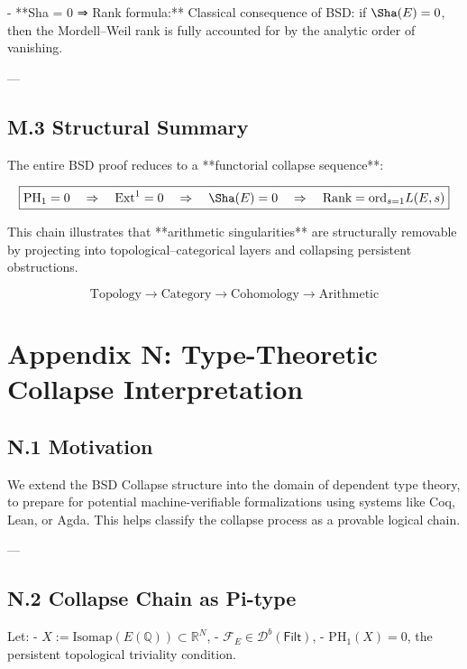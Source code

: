 - **Sha = 0 ⇒ Rank formula:**  
  Classical consequence of BSD: if \( \Sha(E) = 0 \), then the Mordell–Weil rank is fully accounted for by the analytic order of vanishing.

---

\subsection*{M.3 Structural Summary}

The entire BSD proof reduces to a **functorial collapse sequence**:

\[
\boxed{
\mathrm{PH}_1 = 0 \quad \Rightarrow \quad \mathrm{Ext}^1 = 0 \quad \Rightarrow \quad \Sha(E) = 0 \quad \Rightarrow \quad \text{Rank} = \text{ord}_{s=1} L(E,s)
}
\]

This chain illustrates that **arithmetic singularities** are structurally removable  
by projecting into topological–categorical layers and collapsing persistent obstructions.

\[
\boxed{
\text{Topology} \to \text{Category} \to \text{Cohomology} \to \text{Arithmetic}
}
\]



\section*{Appendix N: Type-Theoretic Collapse Interpretation}

\subsection*{N.1 Motivation}

We extend the BSD Collapse structure into the domain of dependent type theory,  
to prepare for potential machine-verifiable formalizations using systems like Coq, Lean, or Agda.  
This helps classify the collapse process as a provable logical chain.

---

\subsection*{N.2 Collapse Chain as Pi-type}

Let:
- \( X := \mathrm{Isomap}(E(\mathbb{Q})) \subset \mathbb{R}^N \),
- \( \mathcal{F}_E \in \mathcal{D}^b(\mathsf{Filt}) \),
- \( \mathrm{PH}_1(X) = 0 \), the persistent topological triviality condition.

